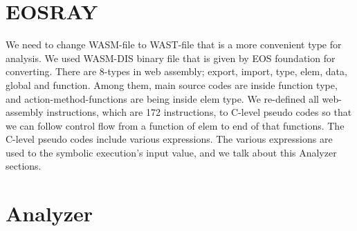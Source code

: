 \section{EOSRAY}
We need to change WASM-file to WAST-file that is a more convenient type for analysis. We used WASM-DIS binary file that is given by EOS foundation for converting. There are 8-types in web assembly; export, import, type, elem, data, global and function. Among them, main source codes are inside function type, and action-method-functions are being inside elem type. We re-defined all web-assembly instructions, which are 172 instructions, to C-level pseudo codes so that we can follow control flow from a function of elem to end of that functions. The C-level pseudo codes include various expressions. The various expressions are used to the symbolic execution's input value, and we talk about this Analyzer sections.

\section{Analyzer}


